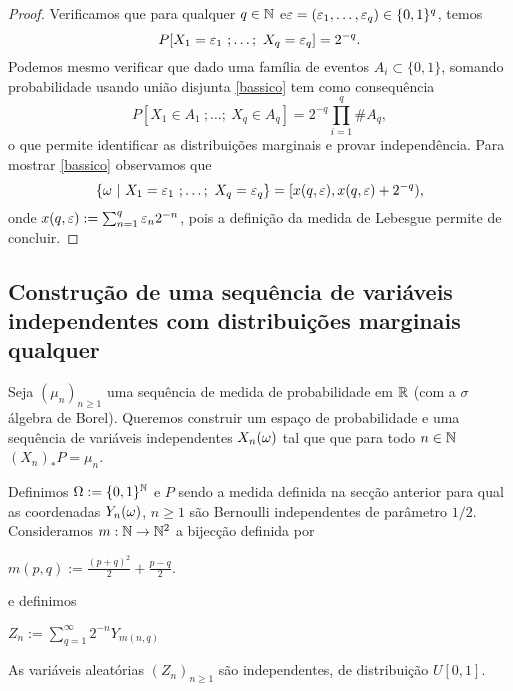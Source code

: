  \begin{proof}
Verificamos que para qualquer $q\in {\ensuremath{\mathbb N}}$ e$\varepsilon=(\varepsilon_1,\dots,\varepsilon_q)\in \{0,1\}^q$,
  temos
    \begin{equation}\label{bassico}
   P[X_{1}=\varepsilon_1\ ;\dots; \ X_{q}=\varepsilon_q]=2^{-q}.
  \end{equation}
Podemos mesmo verificar que dado uma família de eventos $A_i\subset \{0,1\}$, somando probabilidade usando união disjunta \eqref{bassico} tem como consequência
   \begin{equation}
   P[X_{1}\in A_1 \ ;\dots; \ X_{q}\in A_q]=2^{-q} \prod_{i=1}^q \# A_q,
  \end{equation}
  o que permite identificar as distribuições marginais e provar independência.
Para mostrar \eqref{bassico} observamos que
  $$ \{ \go \ | \ X_{1}=\gep_1\ ;\dots; \ X_{q}=\gep_q \}= [x(q,\gep),x(q,\gep)+2^{-q}),$$
  onde $x(q,\varepsilon):=\sum_{n=1}^q \varepsilon_n 2^{-n}$, pois
a definição da medida de Lebesgue permite de concluir.


  \end{proof}





 \subsection{Construção de uma sequência de variáveis independentes com distribuições marginais qualquer}

Seja $(\mu_n)_{n\ge 1}$ uma sequência de medida de probabilidade em ${\mathbb R}$ (com a $\sigma$ álgebra de Borel).
Queremos construir um espaço de probabilidade e uma sequência de variáveis independentes $X_n(\omega)$ tal que que para todo $n\in{\ensuremath{\mathbb N}}$
$(X_n)_*P=\mu_n$.


\medskip

Definimos $\Omega:=\{0,1\}^{{\mathbb N}}$ e $P$ sendo a medida definida na secção anterior para qual
as coordenadas $Y_n(\omega)$, $n\ge 1$  são Bernoulli independentes de parâmetro $1/2$.
Consideramos $m: {\mathbb N}\to {\ensuremath{\mathbb N}}^2$ a bijecção definida por

$m(p,q):= \frac{(p+q)^2}{2}+\frac{p-q}{2}.$

e definimos

$Z_n:=\sum_{q=1}^{\infty} 2^{-n} Y_{m(n,q)} $

\begin{lemma}
As variáveis aleatórias $(Z_n)_{n\ge 1}$ são independentes, de distribuição $U[0,1]$.
\end{lemma}

